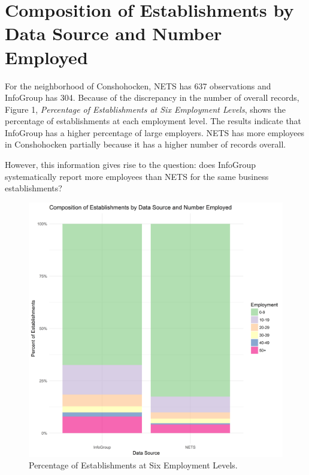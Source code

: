 \documentclass[paper = letter, fontsize = 11pt]{scrartcl}
\begin{document}
\section{Composition of Establishments by Data Source and Number Employed}
For the neighborhood of Conshohocken, NETS has 637 observations and InfoGroup has 304. Because of the discrepancy in the number of overall records, Figure 1, \textit{Percentage of Establishments at Six Employment Levels}, shows the percentage of establishments at each employment level. The results indicate that InfoGroup has a higher percentage of large employers. NETS has more employees in Conshohocken partially because it has a higher number of records overall.\par
However, this information gives rise to the question: does InfoGroup systematically report more employees than NETS for the same business establishments?
\clearpage
\begin{figure}[h]
	\includegraphics[width = \textwidth]{employmentComposition}
	\caption{Percentage of Establishments at Six Employment Levels.}
\end{figure}
\end{document}
